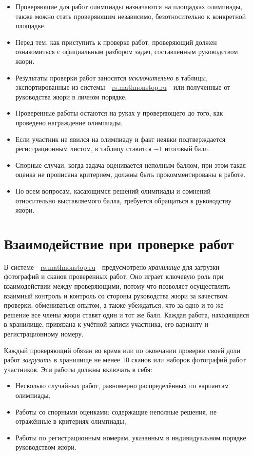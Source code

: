 \documentclass[a4paper,12pt]{article}
\begin{document}
\begin{itemize}
	\item Проверяющие для работ олимпиады назначаются на площадках олимпиады, также можно стать проверяющим независимо, безотносительно к конкретной площадке.
	\item Перед тем, как приступить к проверке работ, проверяющий должен ознакомиться с официальным разбором задач, составленным руководством жюри.
	\item Результаты проверки работ заносятся {\it исключительно} в таблицы, экспортированные из системы\ \ \url{rs.mathnonstop.ru}\ \ или полученные от руководства жюри в личном порядке.
	\item Проверенные работы остаются на руках у проверяющего до того, как проведено награждение олимпиады.
	\item Если участник не явился на олимпиаду и факт неявки подтверждается регистрационным листом, в таблицу ставится $-1$ итоговый балл.
	\item Спорные случаи, когда задача оценивается неполным баллом, при этом такая оценка не прописана критерием, должны быть прокомментированы в работе.
	\item По всем вопросам, касающимся решений олимпиады и сомнений относительно выставляемого балла, требуется обращаться к руководству жюри.
\end{itemize}

\section{Взаимодействие при проверке работ}

В системе\ \ \url{rs.mathnonstop.ru}\ \ предусмотрено {\it хранилище} для загрузки фотографий и сканов проверенных работ. Оно играет ключевую роль при взаимодействии между проверяющими, потому что позволяет осуществлять взаимный контроль и контроль со стороны руководства жюри за качеством проверки, обмениваться опытом, а также убеждаться, что за одно и то же решение все члены жюри ставят один и тот же балл. Каждая работа, находящаяся в хранилище, привязана к учётной записи участника, его варианту и регистрационному номеру.

Каждый проверяющий обязан во время или по окончании проверки своей доли работ {\it загрузить} в хранилище не менее 10 сканов или наборов фотографий работ участников. Эти работы должны включать в себя:

\begin{itemize}
	\item Несколько случайных работ, равномерно распределённых по вариантам олимпиады,
	\item Работы со спорными оценками: содержащие неполные решения, не отражённые в критериях олимпиады,
	\item Работы по регистрационным номерам, указанным в индивидуальном порядке руководством жюри.
\end{itemize}
\end{document}
